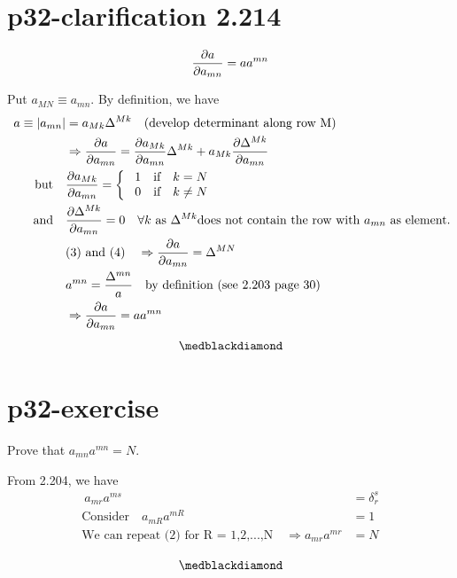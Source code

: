 \section{p32-clarification 2.214}
\begin{tcolorbox}
          $$ \pdv{a}{a_{mn}} = a a^{mn}$$
\end{tcolorbox}
Put $a_{MN}\equiv a_{mn}$. By definition, we have
\begin{align}
\  a\equiv |a_{mn}|  &= a_{Mk}\Delta^{Mk}\quad\text{(develop determinant along row M)}\\
\ &\Rightarrow \pdv{a}{a_{mn}} = \pdv{a_{Mk}}{a_{mn}}\Delta^{Mk} + a_{Mk}\pdv{\Delta^{Mk}}{a_{mn}}\\
\text{but}\quad &\pdv{a_{Mk}}{a_{mn}} = \left\{\begin{array}{c}
\ 1\quad\text{if} \quad k = N\\
\ 0\quad\text{if} \quad k \neq N\\
\end{array}\right.\\
\text{and}\quad &\pdv{\Delta^{Mk}}{a_{mn}} = 0 \quad \forall k \text{ as } \Delta^{Mk} \text{does not contain the row with } a_{mn} \text{ as element.}\\
\ & \text{(3) and (4)}\quad  \Rightarrow \pdv{a}{a_{mn}} = \Delta^{MN}\\ 
\ &  a^{mn} = \frac{\Delta^{mn}}{a}\quad\text{by definition (see 2.203 page 30)}\\
\ & \Rightarrow \pdv{a}{a_{mn}} = aa^{mn}
\end{align} 
$$\medblackdiamond$$
\newpage


\section{p32-exercise}
\begin{tcolorbox}
Prove that $a_{mn}a^{mn} = N$.
\end{tcolorbox}
From 2.204, we have
\begin{align}
\ a_{mr}a^{ms} &= \delta^s_r\\
\text{Consider} \quad a_{mR}a^{mR} &= 1\\
\text{We can repeat (2) for R = 1,2,...,N} \quad \Rightarrow a_{mr}a^{mr} &= N\\
\end{align}
$$\medblackdiamond$$
\newpage


